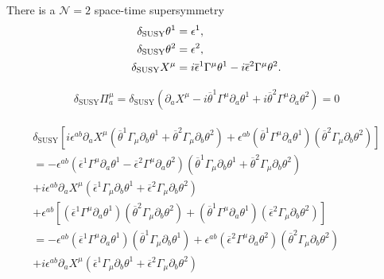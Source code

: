 
There is a $\mathcal{N}=2$ space-time supersymmetry
\begin{align}
	\delta_{\text{SUSY}} \theta^1 &= \epsilon^1,\notag\\
	\delta_{\text{SUSY}} \theta^2 &= \epsilon^2,\notag\\
	\delta_{\text{SUSY}} X^\mu &= i \overline{\epsilon}^1 \Gamma^\mu \theta^1
- i \overline{\epsilon}^2 \Gamma^\mu \theta^2.
\end{align}

\begin{align*}
	\delta_{\text{SUSY}} \Pi_{a}^\mu = \delta_{\text{SUSY}}
	\left( \partial_a X^\mu - i \overline{\theta}^1 \Gamma^\mu \partial_a\theta^1 + i \overline{\theta}^2 \Gamma^\mu \partial_a \theta^2\right) = 0
\end{align*}

\begin{gather*}
	\delta_{\text{SUSY}}
	\left[ i \epsilon^{ab} \partial_a X^\mu
	(\overline{\theta}^1 \Gamma_\mu \partial_b \theta^1
+ \overline{\theta}^2 \Gamma_\mu \partial_b \theta^2)
+ \epsilon^{ab} (\overline{\theta}^1 \Gamma^\mu \partial_a \theta^1)
(\overline{\theta}^2 \Gamma_\mu \partial_b\theta^2)\right] \\
= - \epsilon^{ab}
( \overline{\epsilon}^1 \Gamma^\mu \partial_a \theta^1
-  \overline{\epsilon}^2 \Gamma^\mu \partial_a \theta^2)
	(\overline{\theta}^1 \Gamma_\mu \partial_b \theta^1
+ \overline{\theta}^2 \Gamma_\mu \partial_b \theta^2)\\
+i \epsilon^{ab} \partial_a X^\mu
	(\overline{\epsilon}^1 \Gamma_\mu \partial_b \theta^1
+ \overline{\epsilon}^2 \Gamma_\mu \partial_b \theta^2) \\
+ \epsilon^{ab} \left[(\overline{\epsilon}^1 \Gamma^\mu \partial_a \theta^1)
(\overline{\theta}^2 \Gamma_\mu \partial_b\theta^2) + 
(\overline{\theta}^1 \Gamma^\mu \partial_a \theta^1)
(\overline{\epsilon}^2 \Gamma_\mu \partial_b\theta^2 )\right] \\
= -\epsilon^{ab} (\overline{\epsilon}^1\Gamma^\mu\partial_a\theta^1)
(\overline{\theta}^1\Gamma_\mu\partial_b\theta^1)
+\epsilon^{ab} (\overline{\epsilon}^2\Gamma^\mu\partial_a\theta^2)
(\overline{\theta}^2 \Gamma_\mu\partial_b\theta^2) \\
+i \epsilon^{ab} \partial_a X^\mu
	(\overline{\epsilon}^1 \Gamma_\mu \partial_b \theta^1
+ \overline{\epsilon}^2 \Gamma_\mu \partial_b \theta^2) 
\end{gather*}

